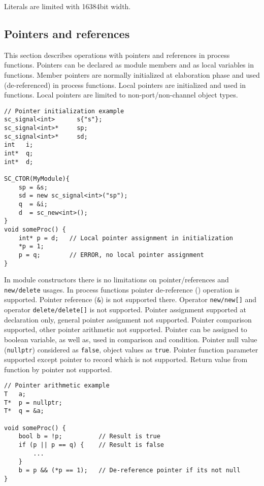 Literals are limited with 16384bit width.

\subsection{Pointers and references}

This section describes operations with pointers and references in process functions. 
Pointers can be declared as module members and as local variables in functions. Member pointers are normally initialized at elaboration phase and used (de-referenced) in process functions. Local pointers are initialized and used in functions. Local pointers are limited to non-port/non-channel object types. 

\begin{lstlisting}[style=mycpp]
// Pointer initialization example
sc_signal<int>      s{"s"};
sc_signal<int>*     sp;
sc_signal<int>*     sd;
int   i;
int*  q;
int*  d;

SC_CTOR(MyModule){
    sp = &s;
    sd = new sc_signal<int>("sp");   
    q  = &i;
    d  = sc_new<int>();
}
void someProc() {
    int* p = d;   // Local pointer assignment in initialization
    *p = 1;
    p = q;        // ERROR, no local pointer assignment   
}
\end{lstlisting}

In module constructors there is no limitations on pointer/references and {\tt new/delete} usages. In process functions pointer de-reference ({\tt *}) operation is supported. Pointer reference ({\tt \&}) is not supported there. Operator {\tt new/new[]} and operator {\tt delete/delete[]} is not supported. Pointer assignment supported at declaration only, general pointer assignment not supported. Pointer comparison supported, other pointer arithmetic not supported. Pointer can be assigned to boolean variable, as well as, used in comparison and condition. Pointer null value ({\tt nullptr}) considered as {\tt false}, object values as {\tt true}.
Pointer function parameter supported except pointer to record which is not supported. Return value from function by pointer not supported.

\begin{lstlisting}[style=mycpp]
// Pointer arithmetic example
T   a;
T*  p = nullptr;
T*  q = &a;

void someProc() {
    bool b = !p;          // Result is true
    if (p || p == q) {    // Result is false
        ...
    }
    b = p && (*p == 1);   // De-reference pointer if its not null
}
\end{lstlisting}

